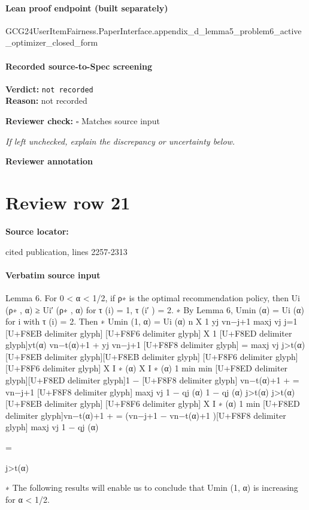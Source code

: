 \documentclass[10pt]{article}
\newcommand{\reviewerbox}{%
  \par\noindent\fbox{\parbox{0.96\linewidth}{\rule{0pt}{0.38in}}}\par
}
\newcommand{\reviewmatch}[1]{%
  \par\noindent\textbf{Reviewer check:} $\square$\; #1\par
  \noindent\emph{If left unchecked, explain the discrepancy or uncertainty below.}\par
}
\begin{document}
\paragraph{Lean proof endpoint (built separately)}\begin{ReviewVerbatim}
GCG24UserItemFairness.PaperInterface.appendix_d_lemma5_problem6_active_optimizer_closed_form
\end{ReviewVerbatim}

\paragraph{Recorded source-to-Spec screening}
\textbf{Verdict:} \texttt{not recorded}
\\
\textbf{Reason:} not recorded
\reviewmatch{Matches source input}
\noindent\textbf{Reviewer annotation}\par
\reviewerbox
\clearpage
\hypertarget{source-claim-d98bc9bd5bb82720}{}
\section*{Review row 21}
\textbf{Source locator:} {\footnotesize\raggedright cited publication, lines 2257-\allowbreak{}2313\par}
\paragraph{Verbatim source input}
\begin{ReviewVerbatim}
Lemma 6. For 0 < α < 1/2, if ρ∗ is the optimal recommendation policy, then Ui (ρ∗ , α) ≥
Ui′ (ρ∗ , α) for τ (i) = 1, τ (i′ ) = 2.
∗
By Lemma 6, Umin
(α) = Ui (α) for i with τ (i) = 2. Then
∗
Umin
(1, α) = Ui (α)
n
X
1
yj vn−j+1
maxj vj j=1
[U+F8EB delimiter glyph]
[U+F8F6 delimiter glyph]
X
1
[U+F8ED delimiter glyph]yt(α) vn−t(α)+1 +
yj vn−j+1 [U+F8F8 delimiter glyph]
=
maxj vj
j>t(α)
[U+F8EB delimiter glyph][U+F8EB delimiter glyph]
[U+F8F6 delimiter glyph]
[U+F8F6 delimiter glyph]
X I ∗ (α)
X I ∗ (α)
1
min
min
[U+F8ED delimiter glyph][U+F8ED delimiter glyph]1 −
[U+F8F8 delimiter glyph] vn−t(α)+1 +
=
vn−j+1 [U+F8F8 delimiter glyph]
maxj vj
1 − qj (α)
1 − qj (α)
j>t(α)
j>t(α)
[U+F8EB delimiter glyph]
[U+F8F6 delimiter glyph]
X I ∗ (α)
1
min
[U+F8ED delimiter glyph]vn−t(α)+1 +
=
(vn−j+1 − vn−t(α)+1 )[U+F8F8 delimiter glyph]
maxj vj
1 − qj (α)

=

j>t(α)

∗
The following results will enable us to conclude that Umin
(1, α) is increasing for α < 1/2.
\end{ReviewVerbatim}
\end{document}
